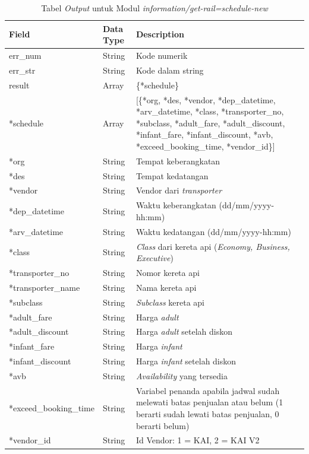 \begin{table}[H]
	\centering 
	\caption{Tabel \textit{Output} untuk Modul \textit{information/get-rail=schedule-new}}
	\label{tab:getrailscheduleoutput}
	\begin{tabular}{|l|l|p{8cm}|}
		\hline
		Field & Data Type & Description\\
		\hline

		\hline
        err\_num & String & Kode numerik\\
        \hline
        err\_str & String & Kode dalam string\\
        \hline
        result & Array & \{*schedule\}\\
        \hline
        \hline
        *schedule & Array & [\{*org, *des, *vendor, *dep\_datetime, *arv\_datetime, *class, *transporter\_no, *subclass, *adult\_fare, *adult\_discount, *infant\_fare, *infant\_discount, *avb, *exceed\_booking\_time, *vendor\_id\}]\\
        \hline
        *org & String & Tempat keberangkatan\\
        \hline
        *des & String & Tempat kedatangan\\
        \hline
        *vendor & String & Vendor dari \textit{transporter}\\
        \hline
        *dep\_datetime & String & Waktu keberangkatan (dd/mm/yyyy-hh:mm)\\
        \hline
        *arv\_datetime & String & Waktu kedatangan (dd/mm/yyyy-hh:mm)\\
        \hline
        *class & String & \textit{Class} dari kereta api (\textit{Economy, Business, Executive})\\
        \hline
        *transporter\_no & String & Nomor kereta api\\
        \hline
        *transporter\_name & String & Nama kereta api\\
        \hline
        *subclass & String & \textit{Subclass} kereta api\\
        \hline
        *adult\_fare & String & Harga \textit{adult}\\
        \hline
        *adult\_discount & String & Harga \textit{adult} setelah diskon\\
        \hline
        *infant\_fare & String & Harga \textit{infant}\\
        \hline
        *infant\_discount & String & Harga \textit{infant} setelah diskon\\
        \hline
        *avb & String & \textit{Availability} yang tersedia\\
        \hline
        *exceed\_booking\_time & String & Variabel penanda apabila jadwal sudah melewati batas penjualan atau belum (1 berarti sudah lewati batas penjualan, 0 berarti belum)\\
        \hline
        *vendor\_id & String & Id Vendor: 1 = KAI, 2 = KAI V2\\
        \hline
		
	\end{tabular} 
\end{table}

